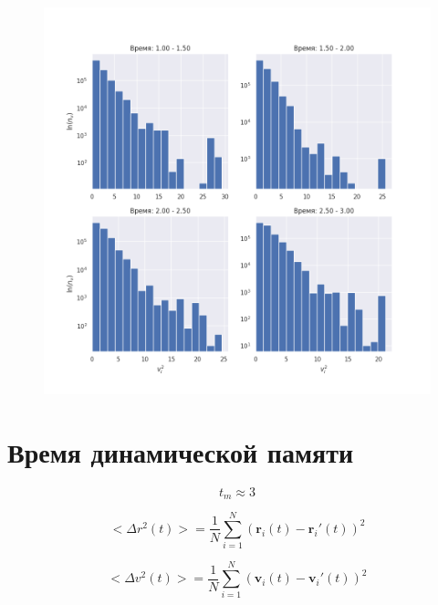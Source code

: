 \documentclass[a4paper,12pt]{article}
\begin{document}
\begin{figure}[H]
    \centering
    \includegraphics[width=\textwidth]{../../media/velocities2.png}
\end{figure}

\section{Время динамической памяти }

\[
t_m \approx 3
\] 

\begin{equation}
    <\Delta r^2(t)> = \frac{1}{N} \sum_{i = 1}^N (\mathbf{r}_i(t) - \mathbf{r}_i'(t))^2
\end{equation}

\begin{equation}
    <\Delta v^2(t)> = \frac{1}{N} \sum_{i = 1}^N (\mathbf{v}_i(t) - \mathbf{v}_i'(t))^2
\end{equation}
\end{document}
